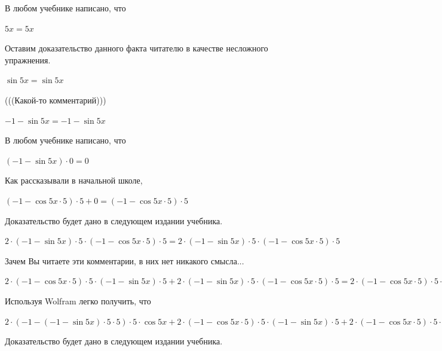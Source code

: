 \documentclass[12pt,a4paper,fleqn]{article}
\theoremstyle{definition}
\begin{document}
В любом учебнике написано, что 

$ 5  x  =  5  x $

Оставим доказательство данного факта читателю в качестве несложного упражнения. 

$\sin 5  x  = \sin 5  x $

(((Какой-то комментарий))) 

$ -1  - \sin 5  x  =  -1  - \sin 5  x $

В любом учебнике написано, что 

$( -1  - \sin 5  x ) \cdot  0  =  0 $

Как рассказывали в начальной школе, 

$( -1  - \cos 5  x  \cdot  5 ) \cdot  5  +  0  = ( -1  - \cos 5  x  \cdot  5 ) \cdot  5 $

Доказательство будет дано в следующем издании учебника. 

$ 2  \cdot ( -1  - \sin 5  x ) \cdot  5  \cdot ( -1  - \cos 5  x  \cdot  5 ) \cdot  5  =  2  \cdot ( -1  - \sin 5  x ) \cdot  5  \cdot ( -1  - \cos 5  x  \cdot  5 ) \cdot  5 $

Зачем Вы читаете эти комментарии, в них нет никакого смысла... 

$ 2  \cdot ( -1  - \cos 5  x  \cdot  5 ) \cdot  5  \cdot ( -1  - \sin 5  x ) \cdot  5  +  2  \cdot ( -1  - \sin 5  x ) \cdot  5  \cdot ( -1  - \cos 5  x  \cdot  5 ) \cdot  5  =  2  \cdot ( -1  - \cos 5  x  \cdot  5 ) \cdot  5  \cdot ( -1  - \sin 5  x ) \cdot  5  +  2  \cdot ( -1  - \sin 5  x ) \cdot  5  \cdot ( -1  - \cos 5  x  \cdot  5 ) \cdot  5 $

Используя Wolfram легко получить, что 

$ 2  \cdot ( -1  - ( -1  - \sin 5  x ) \cdot  5  \cdot  5 ) \cdot  5  \cdot \cos 5  x  +  2  \cdot ( -1  - \cos 5  x  \cdot  5 ) \cdot  5  \cdot ( -1  - \sin 5  x ) \cdot  5  +  2  \cdot ( -1  - \cos 5  x  \cdot  5 ) \cdot  5  \cdot ( -1  - \sin 5  x ) \cdot  5  +  2  \cdot ( -1  - \sin 5  x ) \cdot  5  \cdot ( -1  - \cos 5  x  \cdot  5 ) \cdot  5  =  2  \cdot ( -1  - ( -1  - \sin 5  x ) \cdot  5  \cdot  5 ) \cdot  5  \cdot \cos 5  x  +  2  \cdot ( -1  - \cos 5  x  \cdot  5 ) \cdot  5  \cdot ( -1  - \sin 5  x ) \cdot  5  +  2  \cdot ( -1  - \cos 5  x  \cdot  5 ) \cdot  5  \cdot ( -1  - \sin 5  x ) \cdot  5  +  2  \cdot ( -1  - \sin 5  x ) \cdot  5  \cdot ( -1  - \cos 5  x  \cdot  5 ) \cdot  5 $

Доказательство будет дано в следующем издании учебника. 
\end{document}
